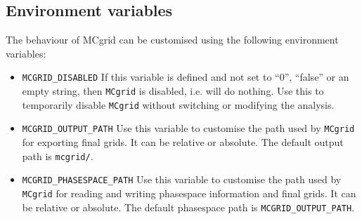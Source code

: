 \documentclass[11pt]{article}
\newcommand{\mcgrid} {{\tt MCgrid}\xspace}
\begin{document}
\subsection{Environment variables}
The behaviour of MCgrid can be customised using the following environment variables:
\begin{itemize}
  \item \lstinline[language=bash]{MCGRID_DISABLED} If this variable is defined and not set to ``0'', ``false'' or an empty string,
    then \mcgrid is disabled, i.e. will do nothing. Use this to temporarily disable \mcgrid without switching or modifying the analysis.
  \item \lstinline[language=bash]{MCGRID_OUTPUT_PATH} Use this variable to customise the path used by \mcgrid
    for exporting final grids. It can be relative or absolute.
    The default output path is \lstinline[language=bash]{mcgrid/}.
  \item \lstinline[language=bash]{MCGRID_PHASESPACE_PATH} Use this variable to customise the path used by
    \mcgrid for reading and writing phasespace information and final grids. It
    can be relative or absolute. The default phasespace path is
    \lstinline[language=bash]{MCGRID_OUTPUT_PATH}.
\end{itemize}
\end{document}

